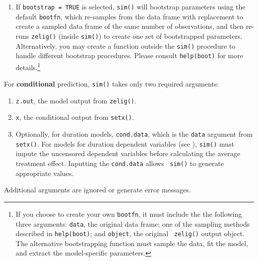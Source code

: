 \begin{enumerate}
\begin{enumerate}
  \item If {\tt bootstrap = TRUE} is selected, {\tt sim()} will
    bootstrap parameters using the default {\tt bootfn}, which
    re-samples from the data frame with replacement to create a
    sampled data frame of the same number of observations, and then
    re-runs {\tt zelig()} (inside {\tt sim()}) to create one set of
    bootstrapped parameters.  Alternatively, you may create a function
    outside the {\tt sim()} procedure to handle different bootstrap
    procedures.  Please consult {\tt help(boot)} for more
    details.\footnote{If you choose to create your own {\tt bootfn},
      it must include the the following three arguments: {\tt data},
      the original data frame; one of the sampling methods described
      in {\tt help(boot)}; and {\tt object}, the original {\tt
        zelig()} output object.  The alternative bootstrapping
      function must sample the data, fit the model, and extract the
      model-specific parameters.}
  \end{enumerate}
  
  For \textbf{conditional} prediction, {\tt sim()} takes only two
  required arguments:
  \begin{enumerate}
  \item {\tt z.out}, the model output from {\tt zelig()}.
  \item {\tt x}, the conditional output from {\tt setx()}.  
  \item Optionally, for duration models, {\tt cond.data}, which is the
    {\tt data} argument from {\tt setx()}.  For models for duration
    dependent variables (see ), {\tt sim()} must impute
    the uncensored dependent variables before calculating the average
    treatment effect.  Inputting the {\tt cond.data} allows {\tt
      sim()} to generate appropriate values.
  \end{enumerate}
  Additional arguments are ignored or generate error messages.  

\end{enumerate}


